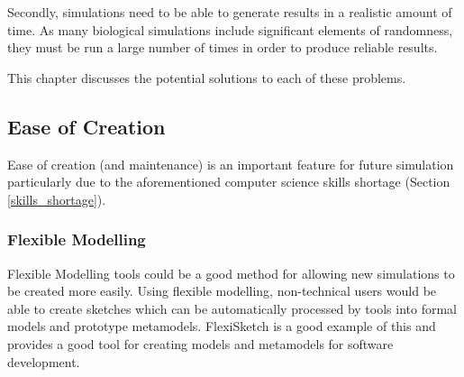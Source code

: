 \documentclass{UoYCSproject}
\begin{document}
Secondly, simulations need to be able to generate results in a realistic amount of time.
As many biological simulations include significant elements of randomness, they must be run a large number of times in order to produce reliable results.

This chapter discusses the potential solutions to each of these problems.

\subsection{Ease of Creation}
Ease of creation (and maintenance) is an important feature for future simulation particularly due to the aforementioned computer science skills shortage (Section \ref{skills_shortage}).







\subsubsection{Flexible Modelling}
Flexible Modelling tools could be a good method for allowing new simulations to be created more easily. Using flexible modelling, non-technical users would be able to create sketches which can be automatically processed by tools into formal models and prototype metamodels\cite{Paige2017}. FlexiSketch is a good example of this and provides a good tool for creating models and metamodels for software development\cite{flexisketch}.
\end{document}
